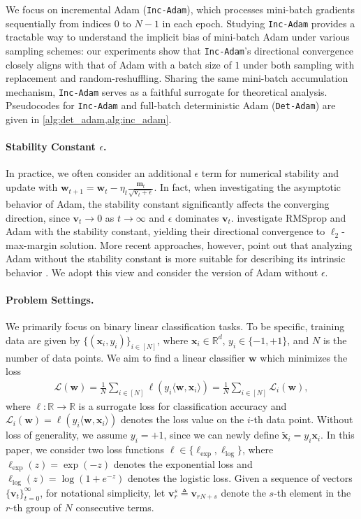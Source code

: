 \documentclass{article} %
\theoremstyle{plain}
\theoremstyle{definition}
\theoremstyle{remark}
\def\sR{{\mathbb{R}}}
\newcommand{\Ls}{\mathcal{L}}
\def\bm{{\mathbf m}}
\def\bx{{\mathbf x}}
\def\bw{{\mathbf w}}
\def\bv{{\mathbf v}}
\begin{document}
We focus on incremental Adam (\texttt{Inc-Adam}), which processes mini-batch gradients sequentially from indices $0$ to $N-1$ in each epoch. Studying \texttt{Inc-Adam} provides a tractable way to understand the implicit bias of mini-batch Adam under various sampling schemes: our experiments show that \texttt{Inc-Adam}'s directional convergence closely aligns with that of Adam with a batch size of $1$ under both sampling with replacement and random-reshuffling. Sharing the same mini-batch accumulation mechanism, \texttt{Inc-Adam} serves as a faithful surrogate for theoretical analysis. Pseudocodes for \texttt{Inc-Adam} and full-batch deterministic Adam (\texttt{Det-Adam}) are given in \cref{alg:det_adam,alg:inc_adam}.

\vspace{-5pt}
\paragraph{Stability Constant $\epsilon$.~}  In practice, we often consider an additional $\epsilon$ term for numerical stability and update with $\bw_{t+1}=\bw_t-\eta_t\frac{\bm_t}{\sqrt{\bv_t+\epsilon}}$. In fact, when investigating the asymptotic behavior of Adam, the stability constant significantly affects the converging direction, since $\bv_t\rightarrow 0$ as $t\rightarrow \infty$ and $\epsilon$ dominates $\bv_t$. \citet{wang2021the} investigate RMSprop and Adam with the stability constant, yielding their directional convergence to $\ell_2$-max-margin solution. More recent approaches, however, point out that analyzing Adam without the stability constant is more suitable for describing its intrinsic behavior \citep{xie2024implicit,zhang2024the,fan2025implicitbiasspectraldescent}. We adopt this view and consider the version of Adam without $\epsilon$.

\vspace{-5pt}
\paragraph{Problem Settings.}
We primarily focus on binary linear classification tasks. To be specific, training data are given by $\{(\bx_i, y_i)\}_{i \in [N]}$, where $\bx_i \in \sR^d$, $y_i \in \{-1, +1\}$, and $N$ is the number of data points. We aim to find a linear classifier $\bw$ which minimizes the loss
\begin{align*}
    \Ls(\bw) = \frac{1}{N}\sum_{i \in [N]} \ell(y_i \langle\bw,  \bx_i\rangle)=\frac{1}{N}\sum_{i \in [N]}\Ls_i(\bw),
\end{align*}
where $\ell:\sR \rightarrow \sR$ is a surrogate loss for classification accuracy and $\Ls_i(\bw)=\ell(y_i \langle \bw, \bx_i\rangle)$ denotes the loss value on the $i$-th data point. Without loss of generality, we assume $y_i=+1$, since we can newly define $\tilde
{\bx}_i=y_i \bx_i$. In this paper, we consider two loss functions $\ell \in \{\ell_{\text{exp}}, \ell_{\text{log}}\}$, where $\ell_{\text{exp}}(z)=\exp(-z)$ denotes the exponential loss and $\ell_{\text{log}}(z) = \log(1+e^{-z})$ denotes the logistic loss. Given a sequence of vectors $\{\bv_t\}_{t=0}^\infty$, for notational simplicity, let $\bv_r^s \triangleq \bv_{rN+s}$ denote the $s$-th element in the $r$-th group of $N$ consecutive terms.
\end{document}
